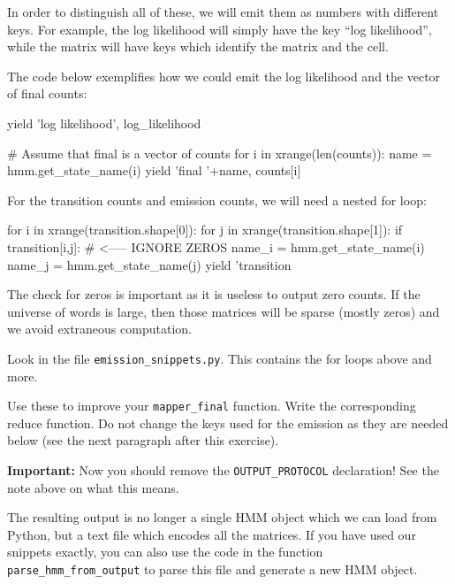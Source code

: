 In order to distinguish all of these, we will emit them as numbers with
different keys. For example, the log likelihood will simply have the key ``log
likelihood'', while the matrix will have keys which identify the matrix and the
cell.

The code below exemplifies how we could emit the log likelihood and the vector
of final counts:

\begin{python}
yield 'log likelihood', log_likelihood

# Assume that final is a vector of counts
for i in xrange(len(counts)):
    name = hmm.get_state_name(i)
    yield 'final '+name, counts[i]
\end{python} %

For the transition counts and emission counts, we will need a nested for loop:

\begin{python}
for i in xrange(transition.shape[0]):
    for j in xrange(transition.shape[1]):
        if transition[i,j]: # <----- IGNORE ZEROS
            name_i = hmm.get_state_name(i)
            name_j = hmm.get_state_name(j)
            yield 'transition %
\end{python}

The check for zeros is important as it is useless to output zero counts. If the
universe of words is large, then those matrices will be sparse (mostly zeros)
and we avoid extraneous computation.

\begin{exercise}
Look in the file \verb+emission_snippets.py+. This contains the for loops above
and more.

Use these to improve your \verb+mapper_final+ function. Write the corresponding
reduce function. Do not change the keys used for the emission as they are
needed below (see the next paragraph after this exercise).

\textbf{Important:} Now you should remove the \verb+OUTPUT_PROTOCOL+
declaration! See the note above on what this means.
\end{exercise}

The resulting output is no longer a single HMM object which we can load from
Python, but a text file which encodes all the matrices. If you have used our
snippets exactly, you can also use the code in the function
\verb+parse_hmm_from_output+ to parse this file and generate a new HMM object.

